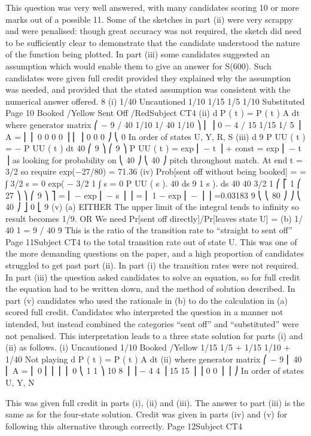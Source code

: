 This question was very well answered, with many candidates scoring 10 or more marks out of
a possible 11. Some of the sketches in part (ii) were very scrappy and were penalised:
though great accuracy was not required, the sketch did need to be sufficiently clear to
demonstrate that the candidate understood the nature of the function being plotted. In part
(iii) some candidates suggested an assumption which would enable them to give an answer
for S(600). Such candidates were given full credit provided they explained why the
assumption was needed, and provided that the stated assumption was consistent with the
numerical answer offered.
8
(i)
1/40
Uncautioned
1/10
1/15
1/5
1/10
Substituted
Page 10
Booked
/Yellow
Sent Off
/RedSubject CT4 %
(ii)
d
P ( t ) = P ( t ) A
dt
where generator matrix
⎛ − 9 / 40 1/10 1/ 40 1/10 ⎞
⎜
⎟
0
− 4 / 15 1/15 1/ 5 ⎟
A = ⎜
⎜ 0
0
0
0 ⎟
⎜
⎟
0
0
0 ⎠
⎝ 0
In order of states {U, Y, R, S}
(iii)
d
9
P UU ( t ) = − P UU ( t )
dt
40
⎛ 9 ⎞
⎛ 9 ⎞
P UU ( t ) = exp ⎜ − t ⎟ + const = exp ⎜ − t ⎟ as looking for probability on
⎝ 40 ⎠
⎝ 40 ⎠
pitch throughout match.
At end t = 3/2 so require exp(−27/80) = 71.36%
(iv)
Prob[sent off without being booked] =
= ∫
3/2
s = 0
exp( −
3/2
1
∫ s = 0 P UU ( s ). 40 ds
9
1
s ). ds
40 40
3/2
1 ⎛
⎡ 1
⎛ 27 ⎞ ⎞
⎛ 9 ⎞ ⎤
= ⎢ − exp ⎜ − s ⎟ ⎥ = ⎜ 1 − exp ⎜ − ⎟ ⎟ =0.03183
9 ⎝
⎝ 80 ⎠ ⎠
⎝ 40 ⎠ ⎦ 0
⎣ 9
(v)
(a)
EITHER
The upper limit of the integral tends to infinity
so result becomes 1/9.
OR
We need
Pr[sent off directly]/Pr[leaves state U]
=
(b)
1/ 40 1
=
9 / 40 9
This is the ratio of the transition rate to “straight to sent off”
Page 11Subject CT4 %
to the total transition rate out of state U.
This was one of the more demanding questions on the paper, and a high proportion of
candidates struggled to get past part (ii). In part (i) the transition rates were not required. In
part (iii) the question asked candidates to solve an equation, so for full credit the equation
had to be written down, and the method of solution described. In part (v) candidates who
used the rationale in (b) to do the calculation in (a) scored full credit.
Candidates who interpreted the question in a manner not intended, but instead combined the
categories “sent off” and “substituted” were not penalised. This interpretation leads to a
three state solution for parts (i) and (ii) as follows.
(i)
Uncautioned
1/10
Booked
/Yellow
1/15
1/5 +
1/15
1/10
+
1/40
Not playing
d
P ( t ) = P ( t ) A
dt
(ii)
where generator matrix
⎛ − 9
⎜ 40
⎜
A = ⎜ 0
⎜
⎜
⎜ ⎜ 0
⎝
1
1 ⎞
10 8 ⎟
⎟
− 4 4 ⎟
15 15 ⎟
⎟
0
0 ⎟
⎟
⎠
In order of states {U, Y, N}

This was given full credit in parts (i), (ii) and (iii). The answer to part (iii) is the same as for
the four-state solution. Credit was given in parts (iv) and (v) for following this alternative
through correctly.
Page 12Subject CT4 %

